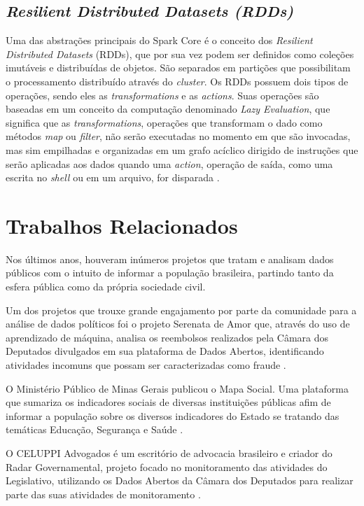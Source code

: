 \subsection{\textit{Resilient Distributed Datasets (RDDs)}}
Uma das abstrações principais do Spark Core é o conceito dos \textit{Resilient Distributed Datasets} (RDDs), que por sua vez podem ser definidos como coleções imutáveis e distribuídas de objetos. São separados em partições que possibilitam o processamento distribuído através do \textit{cluster}. Os RDDs possuem dois tipos de operações, sendo eles as \textit{transformations} e as \textit{actions}. Suas operações são baseadas em um conceito da computação denominado \textit{Lazy Evaluation}, que significa que as \textit{transformations}, operações que transformam o dado como métodos \textit{map} ou \textit{filter}, não serão executadas no momento em que são invocadas, mas sim empilhadas e organizadas em um grafo acíclico dirigido de instruções que serão aplicadas aos dados quando uma \textit{action}, operação de saída, como uma escrita no \textit{shell} ou em um arquivo, for disparada \cite{learningspark}.

\section{Trabalhos Relacionados}
\label{Trabalhos Relacionados}
Nos últimos anos, houveram inúmeros projetos que tratam e analisam dados
públicos com o intuito de informar a população brasileira, partindo tanto da esfera pública como da própria sociedade civil. 

Um dos projetos que trouxe grande engajamento por parte da comunidade para a análise de dados políticos foi o projeto Serenata de Amor que, através do uso de aprendizado de máquina, analisa os reembolsos realizados pela Câmara dos Deputados divulgados em sua plataforma de Dados Abertos, identificando atividades incomuns que possam ser caracterizadas como fraude \cite{serenatadeamor}. 

O Ministério Público de Minas Gerais publicou o Mapa Social. Uma plataforma que sumariza os indicadores sociais de diversas instituições públicas afim de informar a população sobre os diversos indicadores do Estado se tratando das temáticas Educação, Segurança e Saúde \cite{mapasocial}. 

O CELUPPI Advogados é um escritório de advocacia brasileiro e criador do Radar Governamental, projeto focado no monitoramento das atividades do Legislativo, utilizando os Dados Abertos da Câmara dos Deputados para realizar parte das suas atividades de monitoramento \cite{radargovernamental}.
